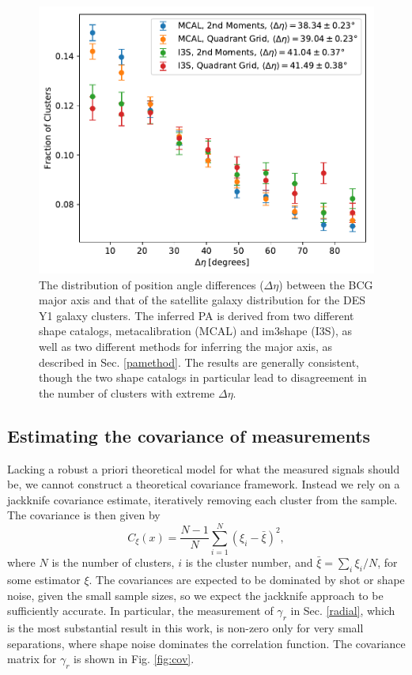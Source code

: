 \documentclass[fleqn,usenatbib]{mnras}
\begin{document}
\begin{figure}
\begin{center}
\includegraphics[width=\columnwidth]{padif_methods_catalogs.pdf}
\end{center}
\caption[]{The distribution of position angle differences ($\Delta \eta$) between the BCG major axis and that of the satellite galaxy distribution for the DES Y1 galaxy clusters. The inferred PA is derived from two different shape catalogs, metacalibration (MCAL) and im3shape (I3S), as well as two different methods for inferring the major axis, as described in Sec. \ref{pamethod}. The results are generally consistent, though the two shape catalogs in particular lead to disagreement in the number of clusters with extreme $\Delta \eta$. 
\label{fig:padiff1}}
\end{figure}



\subsection{Estimating the covariance of measurements}

Lacking a robust a priori theoretical model for what the measured signals should be, we cannot construct a theoretical covariance framework. Instead we rely on a jackknife covariance estimate, iteratively removing each cluster from the sample. The covariance is then given by
\begin{equation}
C_{\xi}(x) = \frac{N-1}{N}\sum_{i=1}^N (\xi_i-\bar{\xi})^2,
\end{equation}
where $N$ is the number of clusters, $i$ is the cluster number, and $\bar{\xi}=\sum_i \xi_i/N$, for some estimator $\xi$. The covariances are expected to be dominated by shot or shape noise, given the small sample sizes, so we expect the jackknife approach to be sufficiently accurate. In particular, the measurement of $\gamma_r$ in Sec. \ref{radial}, which is the most substantial result in this work, is non-zero only for very small separations, where shape noise dominates the correlation function. The covariance matrix for $\gamma_r$ is shown in Fig. \ref{fig:cov}.
\end{document}
